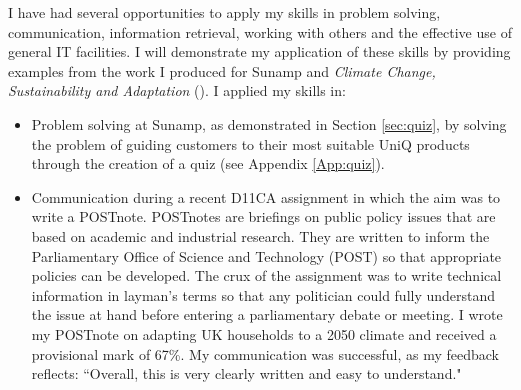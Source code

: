 I have had several opportunities to apply my skills in problem solving, communication, information retrieval, working with others and the effective use of general IT facilities.
I will demonstrate my application of these skills by providing examples from the work I produced for Sunamp and \textit{Climate Change, Sustainability and Adaptation} (\CCSA).
I applied my skills in:
\begin{itemize}
    \item Problem solving at Sunamp, as demonstrated in Section \ref{sec:quiz}, by solving the problem of guiding customers to their most suitable UniQ products through the creation of a quiz (see Appendix \ref{App:quiz}).
    
    \item Communication during a recent D11CA assignment in which the aim was to write a POSTnote.
    POSTnotes are briefings on public policy issues that are based on academic and industrial research.
    They are written to inform the Parliamentary Office of Science and Technology (POST) so that appropriate policies can be developed.
	The crux of the assignment was to write technical information in layman's terms so that any politician could fully understand the issue at hand before entering a parliamentary debate or meeting.
	I wrote my POSTnote on adapting UK households to a 2050 climate and received a provisional mark of 67\%.
	My communication was successful, as my feedback reflects:
	``Overall, this is very clearly written and easy to understand."
    

\end{itemize}
